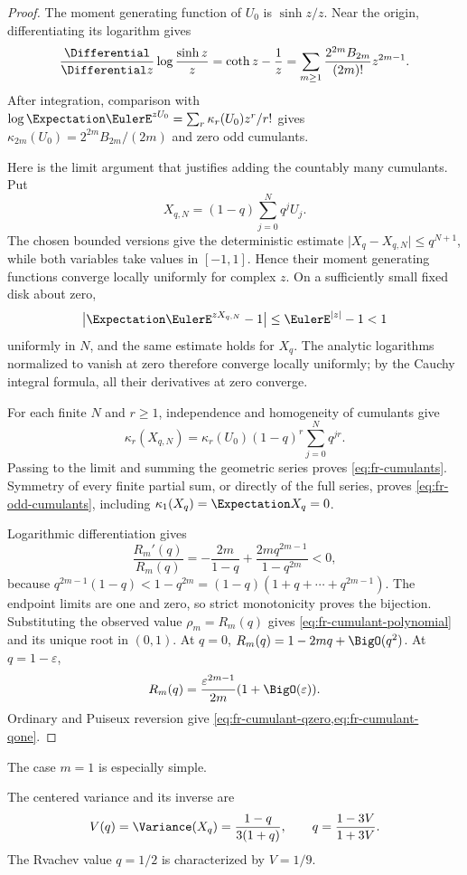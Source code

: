 \begin{proof}
The moment generating function of \(U_0\) is \(\sinh z/z\).  Near the origin,
differentiating its logarithm gives
\[
 \frac{\Differential}{\Differential z}\log\frac{\sinh z}{z}
 =\coth z-\frac1z
 =\sum_{m\ge1}\frac{2^{2m}B_{2m}}{(2m)!}z^{2m-1}.
\]
After integration, comparison with
\(\log\Expectation\EulerE^{zU_0}=\sum_r\kappa_r(U_0)z^r/r!\) gives
\(\kappa_{2m}(U_0)=2^{2m}B_{2m}/(2m)\) and zero odd cumulants.

Here is the limit argument that justifies adding the countably many
cumulants.  Put
\[
 X_{q,N}=(1-q)\sum_{j=0}^{N}q^jU_j.
\]
The chosen bounded versions give the deterministic estimate
\(\lvert X_q-X_{q,N}\rvert\le q^{N+1}\), while both variables take values in
\([-1,1]\).  Hence their moment generating functions converge locally
uniformly for complex \(z\).  On a sufficiently small fixed disk about zero,
\[
 \bigl|\Expectation\EulerE^{zX_{q,N}}-1\bigr|\le \EulerE^{|z|}-1<1
\]
uniformly in \(N\), and the same estimate holds for \(X_q\).  The analytic
logarithms normalized to vanish at zero therefore converge locally uniformly;
by the Cauchy integral formula, all their derivatives at zero converge.

For each finite \(N\) and \(r\ge1\), independence and homogeneity of cumulants give
\[
 \kappa_r(X_{q,N})
 =\kappa_r(U_0)(1-q)^r\sum_{j=0}^{N}q^{jr}.
\]
Passing to the limit and summing the geometric series proves
\cref{eq:fr-cumulants}.  Symmetry of every finite partial sum, or directly of
the full series, proves \cref{eq:fr-odd-cumulants}, including
\(\kappa_1(X_q)=\Expectation X_q=0\).

Logarithmic differentiation gives
\[
 \frac{R_m'(q)}{R_m(q)}
 =-\frac{2m}{1-q}+\frac{2mq^{2m-1}}{1-q^{2m}}<0,
\]
because
\(q^{2m-1}(1-q)<1-q^{2m}=(1-q)(1+q+\cdots+q^{2m-1})\).
The endpoint limits are one and zero, so strict monotonicity proves the
bijection.  Substituting the observed value \(\rho_m=R_m(q)\) gives
\cref{eq:fr-cumulant-polynomial} and its unique root in \((0,1)\).
At \(q=0\), \(R_m(q)=1-2mq+\BigO(q^2)\).  At \(q=1-\varepsilon\),
\[
 R_m(q)=\frac{\varepsilon^{2m-1}}{2m}
 (1+\BigO(\varepsilon)).
\]
Ordinary and Puiseux reversion give
\cref{eq:fr-cumulant-qzero,eq:fr-cumulant-qone}.
\end{proof}

The case \(m=1\) is especially simple.

\begin{corollary}
\label{cor:fr-variance-inverse}
The centered variance and its inverse are
\begin{equation}
 V(q)=\Variance(X_q)=\frac{1-q}{3(1+q)},
 \qquad q=\frac{1-3V}{1+3V}.
 \label{eq:fr-variance-inverse}
\end{equation}
The Rvachev value \(q=1/2\) is characterized by \(V=1/9\).
\end{corollary}

